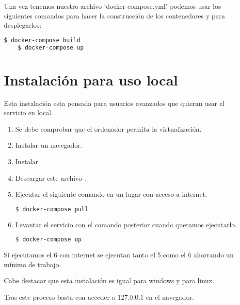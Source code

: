 Una vez tenemos nuestro archivo `docker-compose.yml' podemos usar los siguientes comandos para hacer la construcción de los contenedores y para desplegarlos:

\lstset{style=linestyle}
\begin{lstlisting}[language=bash]
    $ docker-compose build
    $ docker-compose up
\end{lstlisting}

\section{Instalación para uso local}
\label{sec:ins}
 
Esta instalación esta pensada para usuarios avanzados que quieran usar el servicio en local.

\begin{enumerate}
\setlength{\itemsep}{1pt}
\setlength{\parskip}{0pt}
\setlength{\parsep}{0pt}
\item Se debe comprobar que el ordenador permita la virtualización.
\item Instalar un navegador.
\item Instalar 
\item Descargar este archivo .
\item Ejecutar el siguiente comando en un lugar con acceso a internet.

\lstset{style=linestyle}
\begin{lstlisting}[language=bash]
    $ docker-compose pull 
\end{lstlisting}

\item Levantar el servicio con el comando posterior cuando queramos ejecutarlo.

\lstset{style=linestyle}
\begin{lstlisting}[language=bash]
    $ docker-compose up
\end{lstlisting}

\end{enumerate}

Si ejecutamos el 6 con internet se ejecutan tanto el 5 como el 6 ahorrando un mínimo de trabajo.

Cabe destacar que esta instalación es igual para windows y para linux.

Tras este proceso basta con acceder a 127.0.0.1 en el navegador.